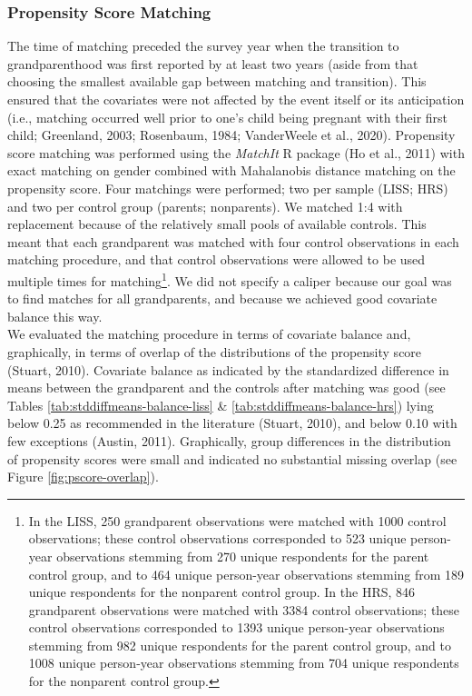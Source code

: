 \documentclass[
  english,
  man, noextraspace]{apa7}
\begin{document}
\hypertarget{propensity-score-matching}{%
\subsubsection{Propensity Score Matching}\label{propensity-score-matching}}

The time of matching preceded the survey year when the transition to grandparenthood was first reported by at least two years (aside from that choosing the smallest available gap between matching and transition). This ensured that the covariates were not affected by the event itself or its anticipation (i.e., matching occurred well prior to one's child being pregnant with their first child; Greenland, 2003; Rosenbaum, 1984; VanderWeele et al., 2020). Propensity score matching was performed using the \emph{MatchIt} R package (Ho et al., 2011) with exact matching on gender combined with Mahalanobis distance matching on the propensity score. Four matchings were performed; two per sample (LISS; HRS) and two per control group (parents; nonparents). We matched 1:4 with replacement because of the relatively small pools of available controls. This meant that each grandparent was matched with four control observations in each matching procedure, and that control observations were allowed to be used multiple times for matching\footnote{In the LISS, 250 grandparent observations were matched with 1000 control observations; these control observations corresponded to 523 unique person-year observations stemming from 270 unique respondents for the parent control group, and to 464 unique person-year observations stemming from 189 unique respondents for the nonparent control group. In the HRS, 846 grandparent observations were matched with 3384 control observations; these control observations corresponded to 1393 unique person-year observations stemming from 982 unique respondents for the parent control group, and to 1008 unique person-year observations stemming from 704 unique respondents for the nonparent control group.}. We did not specify a caliper because our goal was to find matches for all grandparents, and because we achieved good covariate balance this way.\\
We evaluated the matching procedure in terms of covariate balance and, graphically, in terms of overlap of the distributions of the propensity score (Stuart, 2010). Covariate balance as indicated by the standardized difference in means between the grandparent and the controls after matching was good (see Tables \ref{tab:stddiffmeans-balance-liss} \& \ref{tab:stddiffmeans-balance-hrs}) lying below 0.25 as recommended in the literature (Stuart, 2010), and below 0.10 with few exceptions (Austin, 2011). Graphically, group differences in the distribution of propensity scores were small and indicated no substantial missing overlap (see Figure \ref{fig:pscore-overlap}).\\
\end{document}
